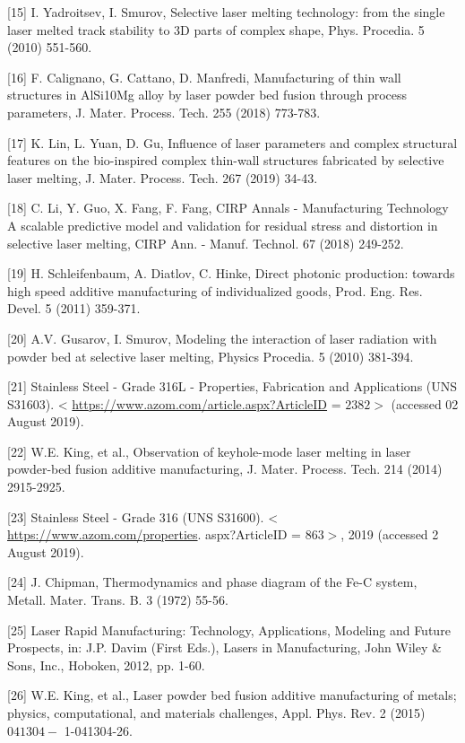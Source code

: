 \documentclass[10pt]{article}
\begin{document}
[15] I. Yadroitsev, I. Smurov, Selective laser melting technology: from the single laser melted track stability to 3D parts of complex shape, Phys. Procedia. 5 (2010) 551-560.

[16] F. Calignano, G. Cattano, D. Manfredi, Manufacturing of thin wall structures in AlSi10Mg alloy by laser powder bed fusion through process parameters, J. Mater. Process. Tech. 255 (2018) 773-783.

[17] K. Lin, L. Yuan, D. Gu, Influence of laser parameters and complex structural features on the bio-inspired complex thin-wall structures fabricated by selective laser melting, J. Mater. Process. Tech. 267 (2019) 34-43.

[18] C. Li, Y. Guo, X. Fang, F. Fang, CIRP Annals - Manufacturing Technology A scalable predictive model and validation for residual stress and distortion in selective laser melting, CIRP Ann. - Manuf. Technol. 67 (2018) 249-252.

[19] H. Schleifenbaum, A. Diatlov, C. Hinke, Direct photonic production: towards high speed additive manufacturing of individualized goods, Prod. Eng. Res. Devel. 5 (2011) 359-371.

[20] A.V. Gusarov, I. Smurov, Modeling the interaction of laser radiation with powder bed at selective laser melting, Physics Procedia. 5 (2010) 381-394.

[21] Stainless Steel - Grade 316L - Properties, Fabrication and Applications (UNS S31603). < \href{https://www.azom.com/article.aspx?ArticleID}{https://www.azom.com/article.aspx?ArticleID} = $2382>$ (accessed 02 August 2019).

[22] W.E. King, et al., Observation of keyhole-mode laser melting in laser powder-bed fusion additive manufacturing, J. Mater. Process. Tech. 214 (2014) 2915-2925.

[23] Stainless Steel - Grade 316 (UNS S31600). < \href{https://www.azom.com/properties}{https://www.azom.com/properties}. aspx?ArticleID = $863>$, 2019 (accessed 2 August 2019).

[24] J. Chipman, Thermodynamics and phase diagram of the Fe-C system, Metall. Mater. Trans. B. 3 (1972) 55-56.

[25] Laser Rapid Manufacturing: Technology, Applications, Modeling and Future Prospects, in: J.P. Davim (First Eds.), Lasers in Manufacturing, John Wiley \& Sons, Inc., Hoboken, 2012, pp. 1-60.

[26] W.E. King, et al., Laser powder bed fusion additive manufacturing of metals; physics, computational, and materials challenges, Appl. Phys. Rev. 2 (2015) $041304-$ 1-041304-26.
\end{document}
